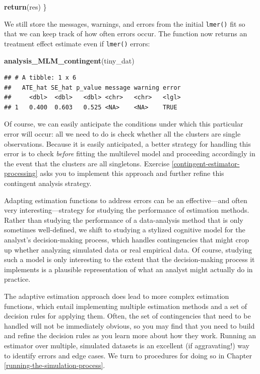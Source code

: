 \documentclass[
]{book}
\newenvironment{Shaded}{\begin{snugshade}}{\end{snugshade}}
\newcommand{\FunctionTok}[1]{\textcolor[rgb]{0.13,0.29,0.53}{\textbf{#1}}}
\newcommand{\NormalTok}[1]{#1}
\begin{document}
\begin{Shaded}
\begin{Highlighting}[]
  \FunctionTok{return}\NormalTok{(res)}
\NormalTok{\}}
\end{Highlighting}
\end{Shaded}

We still store the messages, warnings, and errors from the initial \texttt{lmer()} fit so that we can keep track of how often errors occur.
The function now returns an treatment effect estimate even if \texttt{lmer()} errors:

\begin{Shaded}
\begin{Highlighting}[]
\FunctionTok{analysis\_MLM\_contingent}\NormalTok{(tiny\_dat)}
\end{Highlighting}
\end{Shaded}

\begin{verbatim}
## # A tibble: 1 x 6
##   ATE_hat SE_hat p_value message warning error
##     <dbl>  <dbl>   <dbl> <chr>   <chr>   <lgl>
## 1   0.400  0.603   0.525 <NA>    <NA>    TRUE
\end{verbatim}

Of course, we can easily anticipate the conditions under which this particular error will occur: all we need to do is check whether all the clusters are single observations.
Because it is easily anticipated, a better strategy for handling this error is to check \emph{before} fitting the multilevel model and proceeding accordingly in the event that the clusters are all singletons.
Exercise \ref{contingent-estimator-processing} asks you to implement this approach and further refine this contingent analysis strategy.

Adapting estimation functions to address errors can be an effective---and often very interesting---strategy for studying the performance of estimation methods.
Rather than studying the performance of a data-analysis method that is only sometimes well-defined, we shift to studying a stylized cognitive model for the analyst's decision-making process, which handles contingencies that might crop up whether analyzing simulated data or real empirical data.
Of course, studying such a model is only interesting to the extent that the decision-making process it implements is a plausible representation of what an analyst might actually do in practice.

The adaptive estimation approach does lead to more complex estimation functions, which entail implementing multiple estimation methods and a set of decision rules for applying them.
Often, the set of contingencies that need to be handled will not be immediately obvious, so you may find that you need to build and refine the decision rules as you learn more about how they work.
Running an estimator over multiple, simulated datasets is an excellent (if aggravating!) way to identify errors and edge cases.
We turn to procedures for doing so in Chapter \ref{running-the-simulation-process}.
\end{document}
